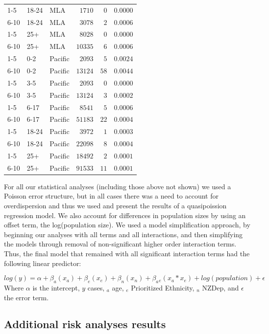 \documentclass{article}
\begin{document}
\begin{table}
\begin{center}
\begin{tabular}{lllrrr}
1-5&18-24&MLA&$   1710$&$  0$&$0.0000$\tabularnewline
6-10&18-24&MLA&$   3078$&$  2$&$0.0006$\tabularnewline
1-5&25+&MLA&$   8028$&$  0$&$0.0000$\tabularnewline
6-10&25+&MLA&$  10335$&$  6$&$0.0006$\tabularnewline
1-5&0-2&Pacific&$   2093$&$  5$&$0.0024$\tabularnewline
6-10&0-2&Pacific&$  13124$&$ 58$&$0.0044$\tabularnewline
1-5&3-5&Pacific&$   2093$&$  0$&$0.0000$\tabularnewline
6-10&3-5&Pacific&$  13124$&$  3$&$0.0002$\tabularnewline
1-5&6-17&Pacific&$   8541$&$  5$&$0.0006$\tabularnewline
6-10&6-17&Pacific&$  51183$&$ 22$&$0.0004$\tabularnewline
1-5&18-24&Pacific&$   3972$&$  1$&$0.0003$\tabularnewline
6-10&18-24&Pacific&$  22098$&$  8$&$0.0004$\tabularnewline
1-5&25+&Pacific&$  18492$&$  2$&$0.0001$\tabularnewline
6-10&25+&Pacific&$  91533$&$ 11$&$0.0001$\tabularnewline
\hline
\end{tabular}\end{center}\label{table:percap}
\end{table}

For all our statistical analyses (including those above not shown) we used a Poisson error structure, but in all cases there was a need to account for overdispersion and thus we used and present the results of a quasipoission regression model. We also account for differences in population sizes by using an offset term, the log(population size). We used a model simplification approach, by beginning our analyses with all terms and all interactions, and then simplifying the models through removal of non-significant higher order interaction terms. Thus, the final model that remained with all significant interaction terms had the following linear predictor:

\begin{equation} \label{eq:reg}
 log(y) = \alpha + \beta _a (x_a)+ \beta _e(x_e)+ \beta _n (x_n) + \beta _a{}_e(x_a * x_e)+ log(population)  + \epsilon
  \end{equation}
Where $\alpha$ is the intercept, $y$ cases, $_a$ age, $_e$ Prioritized Ethnicity, $_n$ NZDep, and $\epsilon$ the error term.




\subsection{Additional risk analyses results}
\end{document}
